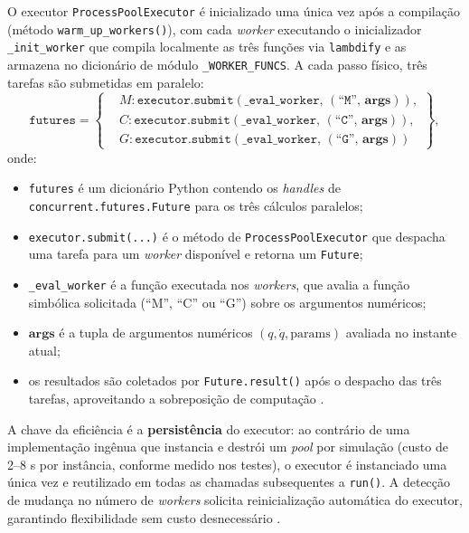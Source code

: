 O executor \texttt{ProcessPoolExecutor} é inicializado uma única vez após a compilação (método \texttt{warm\_up\_workers()}), com cada \textit{worker} executando o inicializador \texttt{\_init\_worker} que compila localmente as três funções via \texttt{lambdify} e as armazena no dicionário de módulo \texttt{\_WORKER\_FUNCS}. A cada passo físico, três tarefas são submetidas em paralelo:
\begin{equation}
    \texttt{futures} = \left\{
    \begin{aligned}
        & M: \texttt{executor.submit}(\texttt{\_eval\_worker},\, (\texttt{``M''},\, \mathbf{args})), \\
        & C: \texttt{executor.submit}(\texttt{\_eval\_worker},\, (\texttt{``C''},\, \mathbf{args})), \\
        & G: \texttt{executor.submit}(\texttt{\_eval\_worker},\, (\texttt{``G''},\, \mathbf{args}))
    \end{aligned}
    \right\},
    \label{eq:parallel_submit}
\end{equation}
onde:
\begin{itemize}
    \item \texttt{futures} é um dicionário Python contendo os \textit{handles} de \texttt{concurrent.futures.Future} para os três cálculos paralelos;
    \item \texttt{executor.submit(...)} é o método de \texttt{ProcessPoolExecutor} que despacha uma tarefa para um \textit{worker} disponível e retorna um \texttt{Future};
    \item \texttt{\_eval\_worker} é a função executada nos \textit{workers}, que avalia a função simbólica solicitada (``M'', ``C'' ou ``G'') sobre os argumentos numéricos;
    \item $\textbf{args}$ é a tupla de argumentos numéricos $(q, \dot{q}, \text{params})$ avaliada no instante atual;
    \item os resultados são coletados por \texttt{Future.result()} após o despacho das três tarefas, aproveitando a sobreposição de computação \cite{beazley2010understanding}.
\end{itemize}

A chave da eficiência é a \textbf{persistência} do executor: ao contrário de uma implementação ingênua que instancia e destrói um \textit{pool} por simulação (custo de 2--8 s por instância, conforme medido nos testes), o executor é instanciado uma única vez e reutilizado em todas as chamadas subsequentes a \texttt{run()}. A detecção de mudança no número de \textit{workers} solicita reinicialização automática do executor, garantindo flexibilidade sem custo desnecessário \cite{leu1986automated}.

